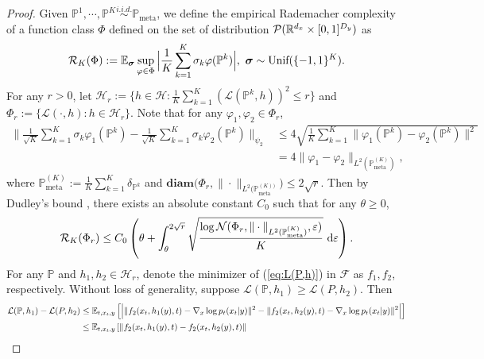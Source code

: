 \documentclass[11pt]{article}
\numberwithin{equation}{section}
\newcommand{\Pmeta}{\mathbb{P}_{\text{meta}}}
\renewcommand{\P}{\mathbb{P}}
\renewcommand{\eqref}[1]{(\ref{#1})}
\begin{document}
\begin{proof}
    Given $\P^1,\cdots,\P^K\overset{\textit{i.i.d.}}{\sim}\Pmeta$, we define the empirical Rademacher complexity of a function class $\Phi$ defined on the set of distribution $\mathcal{P}(\mathbb{R}^{d_x}\times[0,1]^{D_y})$ as
    \begin{equation}
        \mathcal{R}_K(\Phi):=\E_{\bm{\sigma}} \sup_{\varphi\in\Phi}\Big|\frac{1}{K}\sum_{k=1}^K\sigma_k\varphi(\P^k)\Big|,\ \bm{\sigma}\sim \text{Unif}(\{-1,1\}^K).
    \end{equation}
    For any $r>0$, let $\mathcal{H}_r:=\Big\{h\in\mathcal{H}:\frac{1}{K}\sum_{k=1}^K(\mathcal{L}(\P^k,h))^2\leq r\Big\}$ and $\Phi_r:=\{\mathcal{L}(\cdot,h):h\in\mathcal{H}_r\}$.
    Note that for any $\varphi_1,\varphi_2\in\Phi_r$,
    \begin{equation}
        \begin{aligned}
            \Big\|\frac{1}{\sqrt{K}}\sum_{k=1}^K\sigma_k\varphi_1(\P^k)-\frac{1}{\sqrt{K}}\sum_{k=1}^K\sigma_k\varphi_2(\P^k)\Big\|_{\psi_2}
            &\leq 4\sqrt{\frac{1}{K}\sum_{k=1}^K\|\varphi_1(\P^k)-\varphi_2(\P^k)\|^2}\\
            &=4\|\varphi_1-\varphi_2\|_{L^2(\Pmeta^{(K)})},
        \end{aligned}
    \end{equation}
    where $\Pmeta^{(K)}:=\frac{1}{K}\sum_{k=1}^K\delta_{\P^k}$
    and $\textbf{diam}\big(\Phi_r,\|\cdot\|_{L^2(\Pmeta^{(K))}}\big)\leq 2\sqrt{r}$.
    Then by Dudley's bound \citep{van2014probability,wainwright2019high}, there exists an absolute constant $C_0$ such that for any $\theta\geq 0$,
    \begin{equation}\label{eq:rademacher_bound_1}
        \mathcal{R}_K(\Phi_r)\leq C_0\left(\theta+\int_\theta^{2\sqrt{r}}\sqrt{\frac{\log\mathcal{N}(\Phi_r,\|\cdot\|_{L^2(\Pmeta^{(K)})},\varepsilon)}{K}}\ \dif\varepsilon\right).
    \end{equation}
    For any $\P$ and $h_1,h_2\in\mathcal{H}_r$, denote the minimizer of \eqref{eq:L(P,h)} in $\mathcal{F}$ as $f_1,f_2$, respectively.
    Without loss of generality, suppose $\mathcal{L}(\P,h_1)\geq\mathcal{L}(P,h_2)$. Then 
    \begin{equation}
        \begin{aligned}
        \mathcal{L}(\P,h_1)-\mathcal{L}(P,h_2)
        &\leq \E_{t,x_t,y} \left[\Big|\|f_2(x_t,h_1(y),t)-\nabla_x\log p_t(x_t|y)\|^2-\|f_2(x_t,h_2(y),t)-\nabla_x\log p_t(x_t|y)\|^2 \Big|\right] \\
        &\leq \E_{t,x_t,y} \left[\|f_2(x_t,h_1(y),t)-f_2(x_t,h_2(y),t)\|\right. \\

\end{aligned}
\end{equation}
\end{proof}
\end{document}
